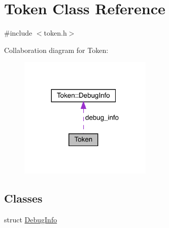 \hypertarget{class_token}{}\section{Token Class Reference}
\label{class_token}


{\ttfamily \#include $<$token.\+h$>$}



Collaboration diagram for Token\+:\nopagebreak
\begin{figure}[H]
\begin{center}
\leavevmode
\includegraphics[width=179pt]{class_token__coll__graph}
\end{center}
\end{figure}
\subsection*{Classes}
\begin{DoxyCompactItemize}
\item 
struct \hyperlink{struct_token_1_1_debug_info}{Debug\+Info}
\end{DoxyCompactItemize}
